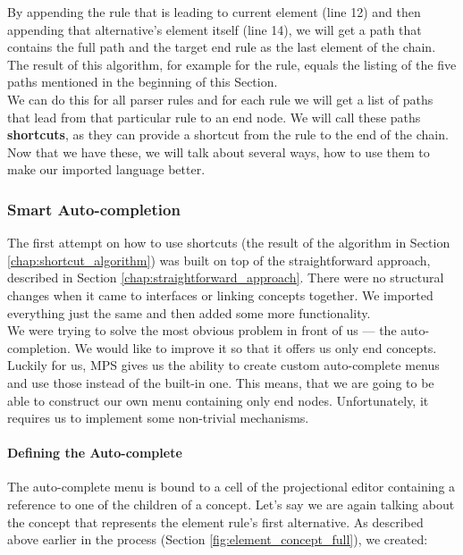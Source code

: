By appending the rule that is leading to current element (line 12) and then appending that alternative's element itself (line 14), we will get a path that contains the full path and the target end rule as the last element of the chain.
The result of this algorithm, for example for the  rule, equals the listing of the five paths mentioned in the beginning of this Section.
\\

We can do this for all parser rules and for each rule we will get a list of paths that lead from that particular rule to an end node.
We will call these paths \textbf{shortcuts}, as they can provide a shortcut from the rule to the end of the chain.
Now that we have these, we will talk about several ways, how to use them to make our imported language better.

\subsubsection{Smart Auto-completion}

The first attempt on how to use shortcuts (the result of the algorithm in Section \ref{chap:shortcut_algorithm}) was built on top of the straightforward approach, described in Section \ref{chap:straightforward_approach}.
There were no structural changes when it came to interfaces or linking concepts together.
We imported everything just the same and then added some more functionality.
\\

We were trying to solve the most obvious problem in front of us --- the auto-completion.
We would like to improve it so that it offers us only end concepts.
Luckily for us, MPS gives us the ability to create custom auto-complete menus and use those instead of the built-in one.
This means, that we are going to be able to construct our own menu containing only end nodes.
Unfortunately, it requires us to implement some non-trivial mechanisms.

\paragraph{Defining the Auto-complete}

The auto-complete menu is bound to a cell of the projectional editor containing a reference to one of the children of a concept.
Let's say we are again talking about the concept that represents the element rule's first alternative.
As described above earlier in the process (Section \ref{fig:element_concept_full}), we created:

